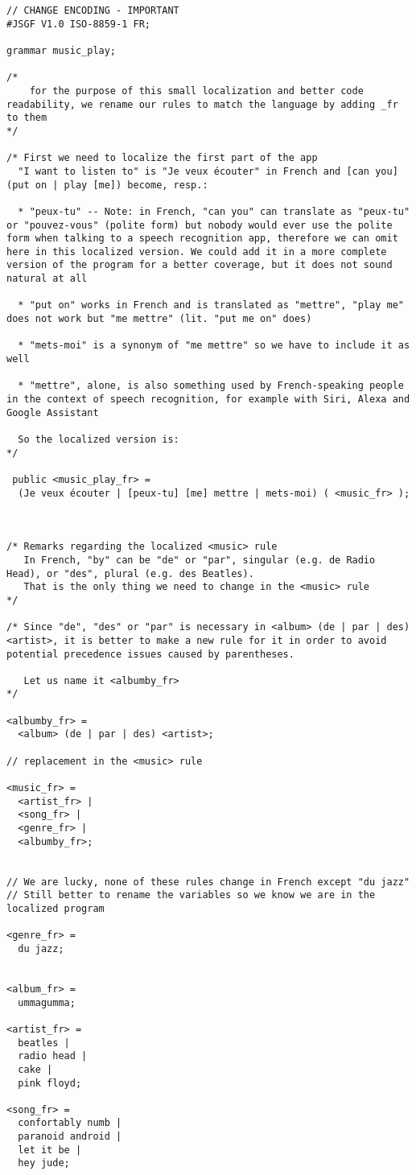 \documentclass[12pt, a4paper]{article}
\begin{document}
\begin{lstlisting}
// CHANGE ENCODING - IMPORTANT
#JSGF V1.0 ISO-8859-1 FR;

grammar music_play;

/*
    for the purpose of this small localization and better code readability, we rename our rules to match the language by adding _fr to them
*/

/* First we need to localize the first part of the app
  "I want to listen to" is "Je veux écouter" in French and [can you] (put on | play [me]) become, resp.:
  
  * "peux-tu" -- Note: in French, "can you" can translate as "peux-tu" or "pouvez-vous" (polite form) but nobody would ever use the polite form when talking to a speech recognition app, therefore we can omit here in this localized version. We could add it in a more complete version of the program for a better coverage, but it does not sound natural at all
  
  * "put on" works in French and is translated as "mettre", "play me" does not work but "me mettre" (lit. "put me on" does) 
  
  * "mets-moi" is a synonym of "me mettre" so we have to include it as well
  
  * "mettre", alone, is also something used by French-speaking people in the context of speech recognition, for example with Siri, Alexa and Google Assistant
  
  So the localized version is:
*/

 public <music_play_fr> =
  (Je veux écouter | [peux-tu] [me] mettre | mets-moi) ( <music_fr> );
  


/* Remarks regarding the localized <music> rule
   In French, "by" can be "de" or "par", singular (e.g. de Radio Head), or "des", plural (e.g. des Beatles).
   That is the only thing we need to change in the <music> rule
*/

/* Since "de", "des" or "par" is necessary in <album> (de | par | des) <artist>, it is better to make a new rule for it in order to avoid potential precedence issues caused by parentheses.

   Let us name it <albumby_fr>
*/

<albumby_fr> = 
  <album> (de | par | des) <artist>;

// replacement in the <music> rule

<music_fr> = 
  <artist_fr> |
  <song_fr> | 
  <genre_fr> | 
  <albumby_fr>;


// We are lucky, none of these rules change in French except "du jazz"
// Still better to rename the variables so we know we are in the localized program

<genre_fr> = 
  du jazz;


<album_fr> = 
  ummagumma;

<artist_fr> =
  beatles |
  radio head |
  cake |
  pink floyd;
  
<song_fr> =
  confortably numb |
  paranoid android |
  let it be |
  hey jude;
\end{lstlisting}
\end{document}
